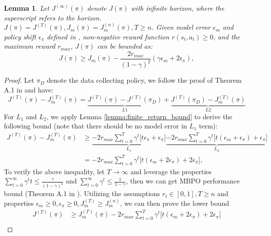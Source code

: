 \documentclass{article}
\newtheorem{lemma}{Lemma}
\begin{document}
\begin{lemma}
\label{lemma:J}
    Let $J^{(\infty)}(\pi)$ denote $J(\pi)$ with infinite horizon, where the superscript refers to the horizon. $J(\pi)=J^{(T)}(\pi), J_m(\pi)=J_m^{(n)}(\pi), T\geq n$. Given model error $\epsilon_m$ and policy shift $\epsilon_{\pi}$ defined in \cite{DBLP:conf/nips/JannerFZL19}, non-negative reward function $r(s_t,a_t) \geq 0$, and the maximum reward $r_{max}$, $J(\pi)$ can be bounded as:
    \begin{equation*}
        J(\pi) \geq J_m(\pi) - \frac{2r_{max}}{(1-\gamma)^2}( \gamma \epsilon_m + 2\epsilon_{\pi} ),
    \end{equation*}
\end{lemma}
\begin{proof}
    Let $\pi_D$ denote the data collecting policy, we follow the proof of Theorem A.1 in \cite{DBLP:conf/nips/JannerFZL19} and have:
    \begin{equation*}
        J^{(T)}(\pi) - J^{(T)}_m(\pi) = \underbrace{J^{(T)}(\pi) - J^{(T)}(\pi_D)}_{L1} + \underbrace{J^{(T)}(\pi_D) - J^{(T)}_m(\pi)}_{L2}
    \end{equation*}
    For $L_1$ and $L_2$, we apply Lemma \ref{lemma:finite_return_bound} to derive the following bound (note that there should be no model error in $L_1$ term): 
    \begin{equation*}
    \begin{aligned}
        J^{(T)}(\pi) - J^{(T)}_m(\pi)
        &\geq   \underbrace{-2r_{max}\sum_{t=0}^{T} \gamma^t\big[ t\epsilon_{\pi} + \epsilon_{\pi} \big]}_{L_1} \underbrace{- 2r_{max}\sum_{t=0}^{T} \gamma^t\big[ t(\epsilon_m +\epsilon_{\pi}) + \epsilon_{\pi} \big]}_{L_2} \\
         &= - 2r_{max}\sum_{t=0}^{T} \gamma^t\big[ t(\epsilon_m +2\epsilon_{\pi}) + 2\epsilon_{\pi} \big],
    \end{aligned}
    \end{equation*}
    To verify the above inequality, let $T\rightarrow\infty$ and leverage the properties $\sum_{t=0}^{\infty}\gamma^t t \leq \frac{\gamma}{(1-\gamma)^2}$ and $\sum_{t=0}^{\infty}\gamma^t \leq \frac{1}{1-\gamma}$, then we can get MBPO performance bound (Theorem A.1 in \cite{DBLP:conf/nips/JannerFZL19}). Utilizing the assumptions $r_t\in[0,1], T\geq n$ and properties $\epsilon_m \geq 0, \epsilon_{\pi} \geq 0, J_m^{(T)}\geq J_m^{(n)}$, we can then prove the lower bound
    \begin{equation*}
    \begin{aligned}
    J^{(T)}(\pi) &\geq J^{(T)}_m(\pi) - 2r_{max}\sum_{t=0}^{T} \gamma^t\big[t(\epsilon_m +2\epsilon_{\pi}) + 2\epsilon_{\pi} \big] \\

\end{aligned}
\end{equation*}
\end{proof}
\end{document}
